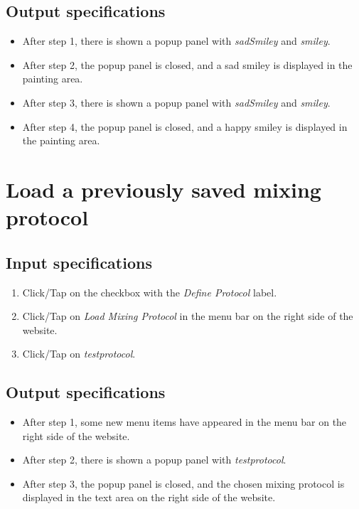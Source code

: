 \subsection*{Output specifications}
\begin{itemize}
\item After step 1, there is shown a popup panel with \emph{sadSmiley} and \emph{smiley}.
\item After step 2, the popup panel is closed, and a sad smiley is displayed in the painting area.
\item After step 3, there is shown a popup panel with \emph{sadSmiley} and \emph{smiley}.
\item After step 4, the popup panel is closed, and a happy smiley is displayed in the painting area.
\end{itemize}

\section{Load a previously saved mixing protocol}

\subsection*{Input specifications}
\begin{enumerate}
\item Click/Tap on the checkbox with the \emph{Define Protocol} label.
\item Click/Tap on \emph{Load Mixing Protocol} in the menu bar on the right side of the website.
\item Click/Tap on \emph{testprotocol}.
\end{enumerate}

\subsection*{Output specifications}
\begin{itemize}
\item After step 1, some new menu items have appeared in the menu bar on the right side of the website.
\item After step 2, there is shown a popup panel with \emph{testprotocol}.
\item After step 3, the popup panel is closed, and the chosen mixing protocol is displayed in the text area on the right side of the website.
\end{itemize}

